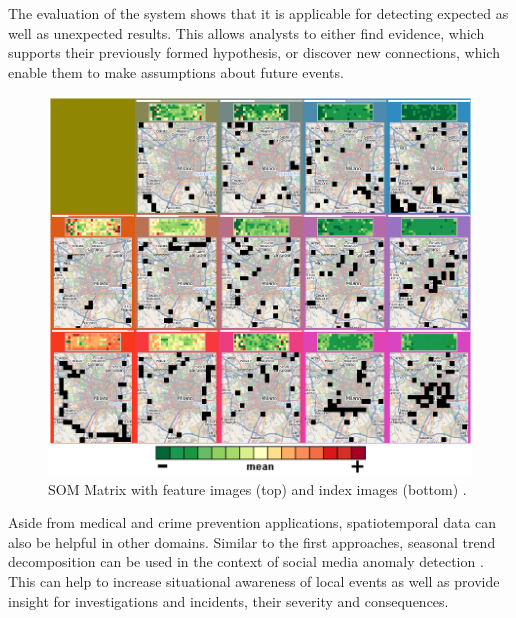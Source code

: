 \documentclass[electronic]{vgtc}             %
\begin{document}
The evaluation of the system shows that it is applicable for detecting expected as well as unexpected results.
This allows analysts to either find evidence, which supports their previously formed hypothesis, or discover new connections, which enable them to make assumptions about future events. 
\begin{figure}[tb]
	\centering
	\includegraphics[width=\columnwidth]{SOM_SiT}
	\caption{SOM Matrix with feature images (top) and index images (bottom) \cite{Andrienko:2010:Space}.
	}
	\label{fig:som}
\end{figure}
Aside from medical and crime prevention applications, spatiotemporal data can also be helpful in other domains. 
Similar to the first approaches, seasonal trend decomposition can be used in the context of social media anomaly detection \cite{Chae:2012, Thom:2012}. 
This can help to increase situational awareness of local events as well as provide insight for investigations and incidents, their severity and consequences.
\end{document}

